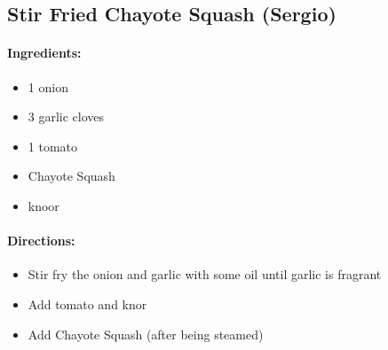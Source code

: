 \documentclass{article}
\begin{document}
\subsection{Stir Fried Chayote Squash (Sergio)}

\paragraph{Ingredients:}

\begin{itemize}
	\item 1 onion
	\item 3 garlic cloves
	\item 1 tomato
	\item Chayote Squash
	\item knoor 
\end{itemize}

\paragraph{Directions:}
\begin{itemize}
	\item Stir fry the onion and garlic with some oil until garlic is fragrant
	\item Add tomato and knor
	\item Add Chayote Squash (after being steamed)
\end{itemize}
\end{document}
